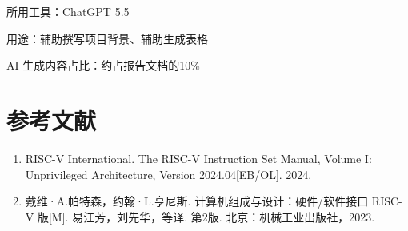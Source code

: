 \documentclass[12pt,a4paper]{ctexart}
\begin{document}
所用工具：ChatGPT 5.5

用途：辅助撰写项目背景、辅助生成表格

AI 生成内容占比：约占报告文档的10\%

\clearpage
\section*{参考文献}

\begin{enumerate}
	\item RISC-V International. The RISC-V Instruction Set Manual, Volume I: Unprivileged Architecture, Version 2024.04[EB/OL]. 2024.

	\item 戴维·A.帕特森，约翰·L.亨尼斯. 计算机组成与设计：硬件/软件接口 RISC-V 版[M]. 易江芳，刘先华，等译. 第2版. 北京：机械工业出版社，2023.
\end{enumerate}
\end{document}
